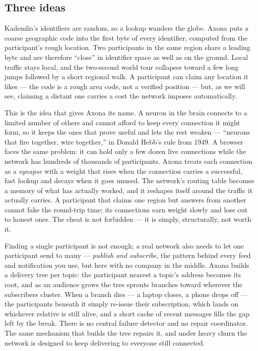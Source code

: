 \documentclass[nobib,justified]{tufte-handout}
\begin{document}
\subsection{Three ideas}

 Kademlia's identifiers are
random, so a lookup wanders the globe. Axona puts a coarse geographic code into
the first byte of every identifier, computed from the participant's rough
location. Two participants in the same region share a leading byte and are
therefore ``close'' in identifier space as well as on the ground. Local traffic
stays local, and the two-second world tour collapses toward a few long jumps
followed by a short regional walk. A participant can claim any location it likes --- the code is a rough area
code, not a verified position --- but, as we will see, claiming a distant one
carries a cost the network imposes automatically.

 This is the idea that
gives Axona its name. A neuron in the brain connects to a limited number of
others and cannot afford to keep every connection it might form, so it keeps
the ones that prove useful and lets the rest weaken --- ``neurons that fire
together, wire together,'' in Donald Hebb's rule from
1949. A browser
faces the same problem: it can hold only a few dozen live connections while the
network has hundreds of thousands of participants. Axona treats each connection
as a \emph{synapse} with a weight that rises when the connection carries a
successful, fast lookup and decays when it goes unused. The network's routing
table becomes a memory of what has actually worked, and it reshapes itself
around the traffic it actually carries. A participant that claims one region but
answers from another cannot fake the round-trip time; its connections earn
weight slowly and lose out to honest ones. The cheat is not forbidden --- it is
simply, structurally, not worth it.

 Finding a single participant
is not enough; a real network also needs to let one participant send to many
--- \emph{publish and subscribe}, the pattern behind every feed and
notification you use, but here with no company in the middle. Axona builds a
delivery tree per topic: the participant nearest a topic's address becomes its
root, and as an audience grows the tree sprouts branches toward wherever the
subscribers cluster. When a branch dies --- a laptop closes, a phone drops off
--- the participants beneath it simply re-issue their subscription, which lands
on whichever relative is still alive, and a short cache of recent messages fills
the gap left by the break. There is no central failure detector and no repair
coordinator. The same mechanism that builds the tree repairs it, and under heavy
churn the network is designed to keep delivering to everyone still connected.
\end{document}
